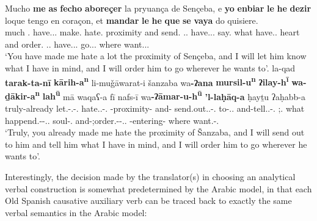 \documentclass[output=paper]{langscibook}
\begin{document}
\begin{exe}
    \ex\label{doehla:ex:15}
    \begin{xlist}
        \ex\label{doehla:ex:15a}
        \gll Mucho \textbf{me} \textbf{as} \textbf{fecho} \textbf{aboreçer} la pryuança de Sençeba, e \textbf{yo} \textbf{enbiar} \textbf{le} \textbf{he} \textbf{dezir} loque tengo en coraçon, et \textbf{mandar} \textbf{le} \textbf{he} \textbf{que} \textbf{se} \textbf{vaya} do quisiere. \\
        much \OBJ.\First\SG{} have.\AUX.\Second\SG.\PRS{} make.\PTCP{} hate.\Inf{} \Def{} proximity \GEN{} \PN{} and \First\SG{} send.\Inf{} \OBJ.\Third\SG.\M{} have.\AUX.\First\SG.\PRS{} say.\Inf{} what have.\First\SG.\PRS{} \LOC{} heart and order.\Inf{} \OBJ.\Third\SG.\M{} have.\AUX.\First\SG.\PRS{} \COMPL{} \REFL{} go.\Third\SG.\PRS.\SBJV{} where want.\Third\SG.\FUT.\SBJV{} \\
        \glt ‘You have made me hate a lot the proximity of Sençeba, and I 	will let him know what I have in mind, and I will order him to 	go wherever he wants to’. \citep[AI.157a]{dohla_libro_2009}
        \ex\label{doehla:ex:15b}
        \gll la-qad	\textbf{tarak-ta-nī} \textbf{kārih-a\textsuperscript{n}} {li-muǧāwarat-i} šanzaba {wa\textbf{-ʔana}} \textbf{mursil-u\textsuperscript{n}} \textbf{ʔilay-h\textsuperscript{ī}} \textbf{wa-ḏākir-a\textsuperscript{n}} \textbf{lah\textsuperscript{ū}} mā waqaʕ-a fī nafs-ī {wa\textbf{-ʔāmar-u-h\textsuperscript{ū}}} \textbf{'l-laḥāq-a} ḥayṯu ʔaḥabb-a \\
        truly-already let.\PFV-\Second\SG.\M-\OBJ.\First\SG{} hate.\ACT.\PTCP-\ACC.\INDF{} \PREP-proximity-\GEN{} \PN{} and-\First\SG{} send.out.\ACT.\PTCP-\NOM.\INDF{} to-\OBJ.\Third\SG.\M{} and-tell.\ACT.\PTCP-\ACC.\INDF{} \OBJ;\Third\SG.\M{} what happend.\IPFV-\IND-\POSS.\Third\SG.\M{} \LOC{} soul-\POSS{}.\First\SG{} and-\First\SG;order.\IPFV-\IND-\POSS.\Third\SG.\M{} \Def-entering-\ACC{} where want.\PFV-\Third\SG.\M{} \\
        \glt ‘Truly, you already made me hate the proximity of Šanzaba, and I will send out to him and tell him what I have in mind, and I will order him to go wherever he wants to’. \citep[fo. 45r]{ibn_al-muqaffa_kitab_nodate}
        \saveex %
    \end{xlist}
\end{exe}


Interestingly, the decision made by the translator(s) in choosing an analytical verbal construction is somewhat predetermined by the Arabic model, in that each Old Spanish causative auxiliary verb can be traced back to exactly the same verbal semantics in the Arabic model:
\end{document}
